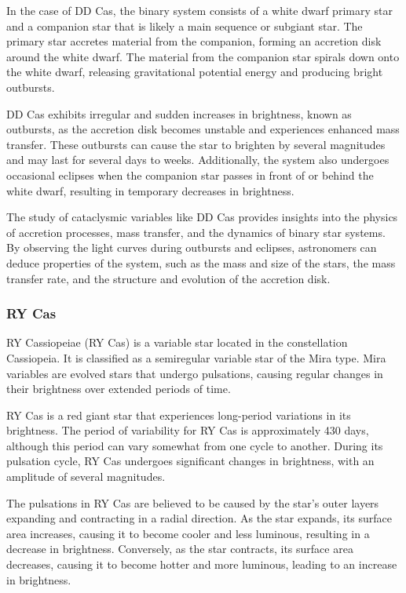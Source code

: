 In the case of DD Cas, the binary system consists of a white dwarf primary star and a companion star that is likely a main sequence or subgiant star. The primary star accretes material from the companion, forming an accretion disk around the white dwarf. The material from the companion star spirals down onto the white dwarf, releasing gravitational potential energy and producing bright outbursts.

DD Cas exhibits irregular and sudden increases in brightness, known as outbursts, as the accretion disk becomes unstable and experiences enhanced mass transfer. These outbursts can cause the star to brighten by several magnitudes and may last for several days to weeks. Additionally, the system also undergoes occasional eclipses when the companion star passes in front of or behind the white dwarf, resulting in temporary decreases in brightness.

The study of cataclysmic variables like DD Cas provides insights into the physics of accretion processes, mass transfer, and the dynamics of binary star systems. By observing the light curves during outbursts and eclipses, astronomers can deduce properties of the system, such as the mass and size of the stars, the mass transfer rate, and the structure and evolution of the accretion disk.

\subsubsection*{ RY Cas }
RY Cassiopeiae (RY Cas) is a variable star located in the constellation Cassiopeia. It is classified as a semiregular variable star of the Mira type. Mira variables are evolved stars that undergo pulsations, causing regular changes in their brightness over extended periods of time.

RY Cas is a red giant star that experiences long-period variations in its brightness. The period of variability for RY Cas is approximately 430 days, although this period can vary somewhat from one cycle to another. During its pulsation cycle, RY Cas undergoes significant changes in brightness, with an amplitude of several magnitudes.

The pulsations in RY Cas are believed to be caused by the star's outer layers expanding and contracting in a radial direction. As the star expands, its surface area increases, causing it to become cooler and less luminous, resulting in a decrease in brightness. Conversely, as the star contracts, its surface area decreases, causing it to become hotter and more luminous, leading to an increase in brightness.


